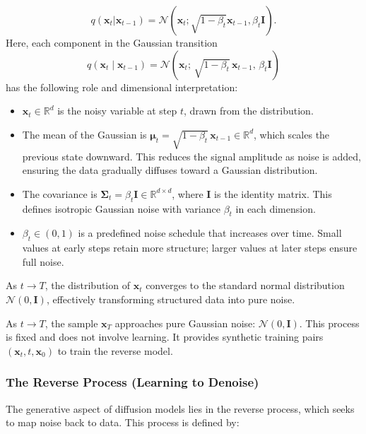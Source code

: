 $$
q(\mathbf{x}_t | \mathbf{x}_{t-1}) = \mathcal{N}(\mathbf{x}_t; \sqrt{1 - \beta_t} \mathbf{x}_{t-1}, \beta_t \mathbf{I}).
$$
Here, each component in the Gaussian transition
\[
q(\mathbf{x}_t \mid \mathbf{x}_{t-1}) = \mathcal{N}\left(\mathbf{x}_t;\, \sqrt{1 - \beta_t} \, \mathbf{x}_{t-1},\, \beta_t \mathbf{I} \right)
\]
has the following role and dimensional interpretation:
\begin{itemize}
    \item \( \mathbf{x}_t \in \mathbb{R}^d \) is the noisy variable at step \( t \), drawn from the distribution.
    \item The mean of the Gaussian is \( \boldsymbol{\mu}_t = \sqrt{1 - \beta_t} \, \mathbf{x}_{t-1} \in \mathbb{R}^d \), which scales the previous state downward. This reduces the signal amplitude as noise is added, ensuring the data gradually diffuses toward a Gaussian distribution.
    \item The covariance is \( \boldsymbol{\Sigma}_t = \beta_t \mathbf{I} \in \mathbb{R}^{d \times d} \), where \( \mathbf{I} \) is the identity matrix. This defines isotropic Gaussian noise with variance \( \beta_t \) in each dimension.
    \item \( \beta_t \in (0, 1) \) is a predefined noise schedule that increases over time. Small values at early steps retain more structure; larger values at later steps ensure full noise.
\end{itemize}

As \( t \to T \), the distribution of \( \mathbf{x}_t \) converges to the standard normal distribution \( \mathcal{N}(0, \mathbf{I}) \), effectively transforming structured data into pure noise.


As $t \to T$, the sample $\mathbf{x}_T$ approaches pure Gaussian noise: $\mathcal{N}(0, \mathbf{I})$.
This process is fixed and does not involve learning. It provides synthetic training pairs $(\mathbf{x}_t, t, \mathbf{x}_0)$ to train the reverse model.

%
\subsubsection{The Reverse Process (Learning to Denoise)}

The generative aspect of diffusion models lies in the reverse process, which seeks to map noise back to data. This process is defined by:


